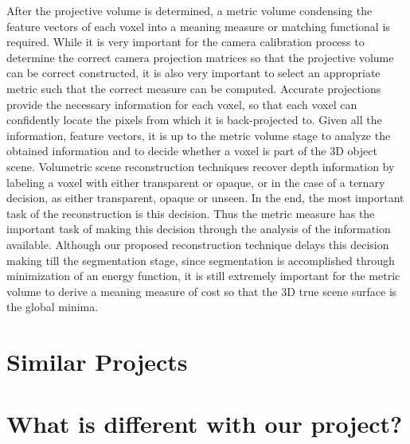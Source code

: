\begin{enumerate}
   After the projective volume is determined, a metric volume condensing the feature vectors of each voxel into a meaning measure or matching functional is required. While it is very important for the camera calibration process to determine the correct camera projection matrices so that the projective volume can be correct constructed, it is also very important to select an appropriate metric such that the correct measure can be computed. Accurate projections provide the necessary information for each voxel, so that each voxel can confidently locate the pixels from which it is back-projected to. Given all the information, feature vectors, it is up to the metric volume stage to analyze the obtained information and to decide whether a voxel is part of the 3D object scene. Volumetric scene reconstruction techniques recover depth information by labeling a voxel with either transparent or opaque, or in the case of a ternary decision, as either transparent, opaque or unseen. In the end, the most important task of the reconstruction is this decision. Thus the metric measure has the important task of making this decision through the analysis of the information available. Although our proposed reconstruction technique delays this decision making till the segmentation stage, since segmentation is accomplished through minimization of an energy function, it is still extremely important for the metric volume to derive a meaning measure of cost so that the 3D true scene surface is the global minima.
	
\end{enumerate}

\section{Similar Projects}


\section{What is different with our project?}
